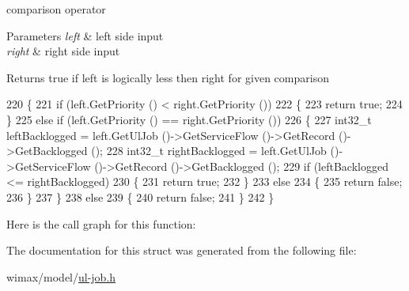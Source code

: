 comparison operator 


\begin{DoxyParams}{Parameters}
{\em left} & left side input \\
\hline
{\em right} & right side input \\
\hline
\end{DoxyParams}
\begin{DoxyReturn}{Returns}
true if left is logically less then right for given comparison 
\end{DoxyReturn}

\begin{DoxyCode}
220    \{ 
221     \textcolor{keywordflow}{if} (left.GetPriority () < right.GetPriority ())
222       \{
223         \textcolor{keywordflow}{return} \textcolor{keyword}{true};
224       \}
225     \textcolor{keywordflow}{else} \textcolor{keywordflow}{if} (left.GetPriority () == right.GetPriority ())
226       \{
227         int32\_t leftBacklogged = left.GetUlJob ()->GetServiceFlow ()->GetRecord ()->GetBacklogged ();
228         int32\_t rightBacklogged = left.GetUlJob ()->GetServiceFlow ()->GetRecord ()->GetBacklogged ();
229         \textcolor{keywordflow}{if} (leftBacklogged <= rightBacklogged)
230           \{
231             \textcolor{keywordflow}{return} \textcolor{keyword}{true};
232           \}
233         \textcolor{keywordflow}{else}
234           \{
235             \textcolor{keywordflow}{return} \textcolor{keyword}{false};
236           \}
237       \}
238     \textcolor{keywordflow}{else}
239       \{
240         \textcolor{keywordflow}{return} \textcolor{keyword}{false};
241       \}
242   \}
\end{DoxyCode}


Here is the call graph for this function\+:




The documentation for this struct was generated from the following file\+:\begin{DoxyCompactItemize}
\item 
wimax/model/\hyperlink{ul-job_8h}{ul-\/job.\+h}\end{DoxyCompactItemize}
